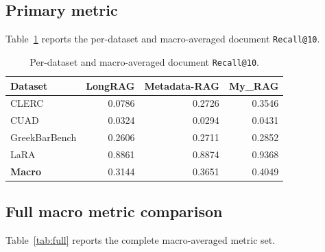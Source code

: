 \documentclass[11pt,a4paper]{article}
\begin{document}
\subsection{Primary metric}
Table~\ref{tab:primary} reports the per-dataset and macro-averaged
document \texttt{Recall@10}.

\begin{table}[h]
\centering
\caption{Per-dataset and macro-averaged document \texttt{Recall@10}.}
\label{tab:primary}
\small
\begin{tabular}{l r r r}
\toprule
\textbf{Dataset} & \textbf{LongRAG} & \textbf{Metadata-RAG}
  & \textbf{My\_RAG} \\
\midrule
CLERC              & \num{0.0786} & \num{0.2726} & \num{0.3546} \\
CUAD               & \num{0.0324} & \num{0.0294} & \num{0.0431} \\
GreekBarBench      & \num{0.2606} & \num{0.2711} & \num{0.2852} \\
LaRA               & \num{0.8861} & \num{0.8874} & \num{0.9368} \\
\midrule
\textbf{Macro}     & \num{0.3144} & \num{0.3651} & \num{0.4049} \\
\bottomrule
\end{tabular}
\end{table}

\subsection{Full macro metric comparison}
Table~\ref{tab:full} reports the complete macro-averaged metric set.
\end{document}
